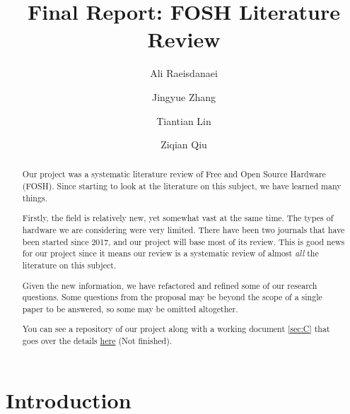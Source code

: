 \documentclass[acmtog]{acmart}
\begin{document}
\title{Final Report: FOSH Literature Review}

\author{Ali Raeisdanaei}

\author{Jingyue Zhang}

\author{Tiantian Lin}

\author{Ziqian Qiu}

\begin{abstract}
Our project was a systematic literature review of Free and Open Source Hardware (FOSH).
Since starting to look at the literature on this subject, we have learned many things. 

Firstly, the field is relatively new, yet somewhat vast at the same time. 
The types of hardware we are considering were very limited.
There have been two journals that have been started since 2017, and our project will base most of its review. 
This is good news for our project since it means our review is a systematic review of almost \textit{all} the literature on this subject. 

Given the new information, we have refactored and refined some of our research questions. 
Some questions from the proposal may be beyond the scope of a single paper to be answered, so some may be omitted altogether. 

You can see a repository of our project along with a working document \ref{sec:C} that goes over the details
\href{https://github.com/aliraeisdanaei/FOSH_Lit_Review/}{here}
(Not finished).
\end{abstract}



\maketitle

\section{Introduction}
\label{introduction}


\end{document}
